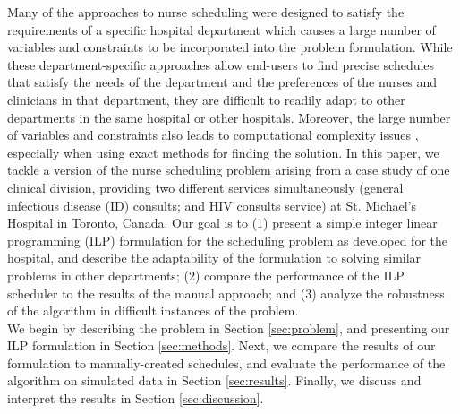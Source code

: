 
Many of the approaches to nurse scheduling were designed to satisfy the requirements of a specific hospital department which causes a large number of variables and constraints to be incorporated into the problem formulation. While these department-specific approaches allow end-users to find precise schedules that satisfy the needs of the department and the preferences of the nurses and clinicians in that department, they are difficult to readily adapt to other departments in the same hospital or other hospitals. %
Moreover, the large number of variables and constraints also leads to computational complexity issues \cite{goos_complexity_1996}, especially when using exact methods for finding the solution. In this paper, we tackle a version of the nurse scheduling problem arising from a case study of one clinical division, providing two different services simultaneously (general infectious disease (ID) consults; and HIV consults service) at St. Michael's Hospital in Toronto, Canada. Our goal is to (1) present a simple integer linear programming (ILP) formulation for the scheduling problem as developed for the hospital, and describe the adaptability of the formulation to solving similar problems in other departments; (2) compare the performance of the ILP scheduler to the results of the manual approach; and (3) analyze the robustness of the algorithm in difficult instances of the problem. \\

We begin by describing the problem in Section \ref{sec:problem}, and presenting our ILP formulation in Section \ref{sec:methods}. Next, we compare the results of our formulation to manually-created schedules, and evaluate the performance of the algorithm on simulated data in Section \ref{sec:results}. Finally, we discuss and interpret the results in Section \ref{sec:discussion}. %
